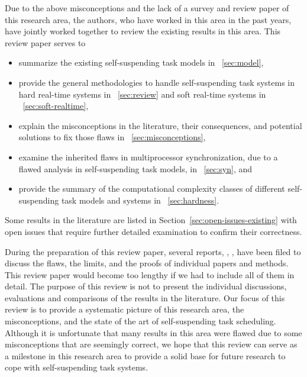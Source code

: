 \noindent Due to the above misconceptions and the lack of a survey and review paper of this research area, the authors, who have worked in this area in the past years, have jointly worked together to review the existing results in this area. This review paper serves to
\begin{itemize}
\item summarize the existing self-suspending task models in \mysectionref{}~\ref{sec:model}, 
\item provide the general methodologies to handle self-suspending task systems in hard real-time systems in \mysectionref{}~\ref{sec:review} and soft real-time systems in \mysectionref{}~\ref{sec:soft-realtime}, 
\item explain the misconceptions in the literature, their consequences, and potential solutions to fix those flaws in \mysectionref{}~\ref{sec:misconceptions}, 
\item examine the inherited flaws in multiprocessor synchronization, due to a flawed analysis in self-suspending task models, in \mysectionref{}~\ref{sec:syn}, and
\item provide the summary of the computational complexity classes of different self-suspending task models and systems in \mysectionref{}~\ref{sec:hardness}.
\end{itemize}
Some results in the literature are listed in Section~\ref{sec:open-issues-existing} with open issues that require further detailed examination to confirm their correctness. 

During the preparation of this review paper, several reports, \ie, \cite{ChenHuangNelissen,ChenBrandenburg,erratu-cong-anderson,BletsasReport2015}, have been filed to discuss the flaws, the limits, and the proofs of individual papers and methods. This review paper would become too lengthy if we had to include all of them in detail.  The purpose of this review is not to present the individual discussions, evaluations and comparisons of the results in the literature. Our focus of this review is to provide a systematic picture of this research area, the misconceptions, and the state of the art of self-suspending task scheduling. Although it is unfortunate that many results in this area were flawed due to some misconceptions that are seemingly correct, we hope that this review can serve as a milestone in this research area to provide a solid base for future research to cope with self-suspending task systems.









    
  

    
  
